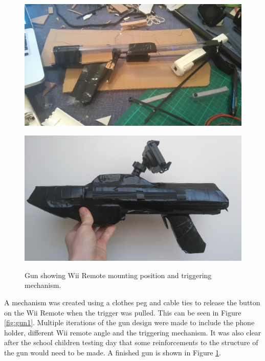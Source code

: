\documentclass[a4paper,11pt]{article}
\begin{document}
\begin{figure}[ht]
  \centering
  \captionsetup{width=.45\textwidth}
  
  \begin{minipage}[t]{.5\textwidth}
      \centering
      \includegraphics[width=.9\textwidth]{gun}
      \caption{Gun showing Wii Remote mounting position and triggering mechanism.}
      \label{fig:gun1}
  \end{minipage}%
  \begin{minipage}[t]{.5\textwidth}
    \centering
    \includegraphics[width=.9\textwidth]{gun2}
    \label{fig:gun2}
  \end{minipage}
\end{figure}

A mechanism was created using a clothes peg and cable ties to release the button on the Wii Remote when the trigger was pulled. This can be seen in Figure \ref{fig:gun1}. Multiple iterations of the gun design were made to include the phone holder, different Wii remote angle and the triggering mechanism. It was also clear after the school children testing day that some reinforcements to the structure of the gun would need to be made. A finished gun is shown in Figure \ref{fig:gun2}.
\end{document}
